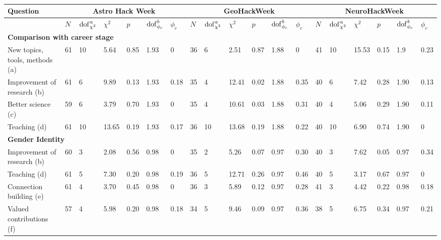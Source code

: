 \begin{table}
\footnotesize
\caption{}
\begin{threeparttable} 
\begin{tabularx}{18cm}{p{3.4cm}p{0.3cm}p{0.33cm}p{0.33cm}p{0.33cm}p{0.33cm}p{0.33cm}p{0.33cm}p{0.33cm}p{0.33cm}p{0.33cm}p{0.33cm}p{0.33cm}p{0.33cm}p{0.33cm}p{0.33cm}p{0.33cm}p{0.33cm}p{0.33cm}}
\toprule
\textbf{Question} & \multicolumn{6}{c}{\textbf{Astro Hack Week}} & \multicolumn{6}{c}{\textbf{GeoHackWeek}} & \multicolumn{6}{c}{\textbf{NeuroHackWeek}} \\ \midrule
 & $N$ & $\mathrm{dof}_{\chi^2}^\emph{a}$ & $\chi^2$ & $p$ & $\mathrm{dof}_{\phi_c}^\emph{b}$ & $\phi_c$ & $N$ & $\mathrm{dof}_{\chi^2}^\emph{a}$ & $\chi^2$ & $p$ & $\mathrm{dof}_{\phi_c}^\emph{b}$ & $\phi_c$ & $N$ & $\mathrm{dof}_{\chi^2}^\emph{a}$ & $\chi^2$ & $p$ & $\mathrm{dof}_{\phi_c}^\emph{b}$ & $\phi_c$ \\ \midrule
\multicolumn{16}{l}{\textbf{Comparison with career stage}}  \\ \midrule
New topics, tools, methods (a) & 61 & 10 & 5.64 & 0.85 & 1.93 & 0 & 36 & 6 & 2.51 & 0.87 & 1.88 & 0 & 41& 10 & 15.53 & 0.15 & 1.9 & 0.23 \\
Improvement of research (b) & 61 & 6 &  9.89 & 0.13 & 1.93 & 0.18 & 35 & 4 & 12.41 & 0.02 & 1.88 & 0.35 & 40 & 6 & 7.42 & 0.28 & 1.90 & 0.13 \\
Better science (c) & 59 & 6 & 3.79 & 0.70 & 1.93 & 0 & 35 & 4 & 10.61 & 0.03 & 1.88 & 0.31 & 40 & 4 &  5.06 & 0.29 & 1.90 & 0.11\\ 
Teaching (d) & 61 & 10 & 13.65 & 0.19 & 1.93 & 0.17 & 36 & 10 & 13.68 & 0.19 & 1.88 & 0.22 & 40 & 10 & 6.90 & 0.74 & 1.90 & 0 \\ \midrule
\multicolumn{16}{l}{\textbf{Gender Identity}} \\ \midrule
Improvement of research (b) & 60 & 3 & 2.08 & 0.56 & 0.98 & 0 & 35 & 2 & 5.26 & 0.07 & 0.97 & 0.30 & 40 & 3 & 7.62 & 0.05 & 0.97 & 0.34\\
Teaching (d) & 61 & 5 & 7.30 & 0.20 & 0.98 & 0.19 & 36 & 5 & 12.71 & 0.26 & 0.97 & 0.46 & 40 &5 & 3.17 & 0.67 & 0.97 & 0 \\
Connection building (e) & 61 & 4 & 3.70 & 0.45 & 0.98 & 0 & 36 & 3 & 5.89 & 0.12 & 0.97 & 0.28 & 41 & 3 & 4.42 & 0.22 & 0.98 & 0.18\\
Valued contributions (f) & 57 & 4 & 5.98 & 0.20 & 0.98 & 0.18 & 34 & 5 & 9.46 & 0.09 & 0.97 & 0.36 & 38 & 5 & 6.75 & 0.34 & 0.97 & 0.21 \\ \midrule

\end{tabularx}
\end{threeparttable}
\end{table}
